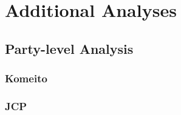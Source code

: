\documentclass[a4paper, 11pt]{article}
\begin{document}
\newpage

\section{Additional Analyses}

\subsection{Party-level Analysis}

\subsubsection*{Komeito}



\newpage

\subsubsection*{JCP}


\end{document}

